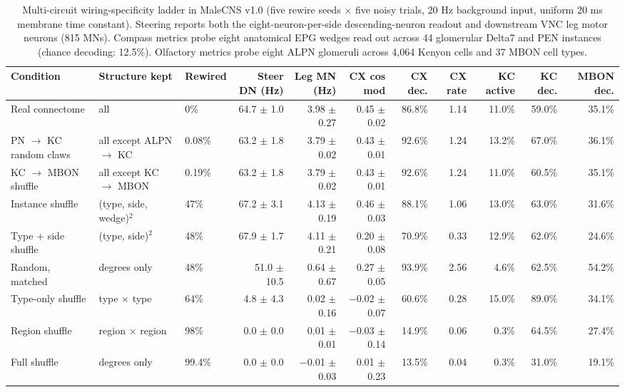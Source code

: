 \documentclass[11pt,a4paper]{article}
\begin{document}
\begin{table}[t]
\centering\small
\caption{Multi-circuit wiring-specificity ladder in MaleCNS v1.0 (five rewire seeds $\times$ five noisy trials, 20 Hz background input, uniform 20 ms membrane time constant). Steering reports both the eight-neuron-per-side descending-neuron readout and downstream VNC leg motor neurons (815 MNs). Compass metrics probe eight anatomical EPG wedges read out across 44 glomerular Delta7 and PEN instances (chance decoding: 12.5\%). Olfactory metrics probe eight ALPN glomeruli across 4,064 Kenyon cells and 37 MBON cell types.}\label{tbl:hierarchy}
\begin{adjustbox}{max width=\textwidth}
\begin{tabular}{lllrrrrrrrr}
\toprule
Condition & Structure kept & Rewired & Steer DN (Hz) & Leg MN (Hz) & CX cos mod & CX dec. & CX rate & KC active & KC dec. & MBON dec. \\
\midrule
Real connectome & all & 0\% & 64.7 $\pm$ 1.0 & 3.98 $\pm$ 0.27 & 0.45 $\pm$ 0.02 & 86.8\% & 1.14 & 11.0\% & 59.0\% & 35.1\% \\
\midrule
PN $\rightarrow$ KC random claws & all except ALPN $\rightarrow$ KC & 0.08\% & 63.2 $\pm$ 1.8 & 3.79 $\pm$ 0.02 & 0.43 $\pm$ 0.01 & 92.6\% & 1.24 & 13.2\% & 67.0\% & 36.1\% \\
KC $\rightarrow$ MBON shuffle & all except KC $\rightarrow$ MBON & 0.19\% & 63.2 $\pm$ 1.8 & 3.79 $\pm$ 0.02 & 0.43 $\pm$ 0.01 & 92.6\% & 1.24 & 11.0\% & 60.5\% & 35.1\% \\
\midrule
Instance shuffle & (type, side, wedge)$^{2}$ & 47\% & 67.2 $\pm$ 3.1 & 4.13 $\pm$ 0.19 & 0.46 $\pm$ 0.03 & 88.1\% & 1.06 & 13.0\% & 63.0\% & 31.6\% \\
Type + side shuffle & (type, side)$^{2}$ & 48\% & 67.9 $\pm$ 1.7 & 4.11 $\pm$ 0.21 & 0.20 $\pm$ 0.08 & 70.9\% & 0.33 & 12.9\% & 62.0\% & 24.6\% \\
Random, matched & degrees only & 48\% & 51.0 $\pm$ 10.5 & 0.64 $\pm$ 0.67 & 0.27 $\pm$ 0.05 & 93.9\% & 2.56 & 4.6\% & 62.5\% & 54.2\% \\
\midrule
Type-only shuffle & type $\times$ type & 64\% & 4.8 $\pm$ 4.3 & 0.02 $\pm$ 0.16 & $-$0.02 $\pm$ 0.07 & 60.6\% & 0.28 & 15.0\% & 89.0\% & 34.1\% \\
Region shuffle & region $\times$ region & 98\% & 0.0 $\pm$ 0.0 & 0.01 $\pm$ 0.01 & $-$0.03 $\pm$ 0.14 & 14.9\% & 0.06 & 0.3\% & 64.5\% & 27.4\% \\
Full shuffle & degrees only & 99.4\% & 0.0 $\pm$ 0.0 & $-$0.01 $\pm$ 0.03 & 0.01 $\pm$ 0.23 & 13.5\% & 0.04 & 0.3\% & 31.0\% & 19.1\% \\
\bottomrule
\end{tabular}
\end{adjustbox}
\end{table}
\end{document}
